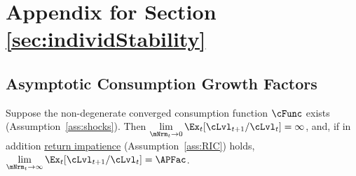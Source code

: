 \documentclass[\econtexRoot/BufferStockTheory]{subfiles}
\begin{document}

\hypertarget{ApndxMTargetIsStable}{}
\section{Appendix for Section \ref{sec:individStability}}\label{sec:ApndxMTargetIsStable}

\subsection{Asymptotic Consumption Growth Factors}\label{subsec:AppxCgrowthFac}

\begin{proposition}\label{prop:convgGrowth}\hypertarget{LimitsAsmtToZero}{}
  Suppose the non-degenerate converged consumption function $\cFunc$ exists (Assumption~\ref{ass:shocks}). Then $\lim\limits_{\mNrm_{t} \rightarrow  0} \Ex_{t}[\cLvl_{t+1}/\cLvl_{t}] =  \infty$, and, if in addition \hyperlink{RIC}{return impatience} (Assumption~\ref{ass:RIC}) holds, $\lim\limits_{\mNrm_{t} \rightarrow \infty} \Ex_{t}[\cLvl_{t+1}/\cLvl_{t}] =  {\APFac}$.
\end{proposition}
\end{document}
